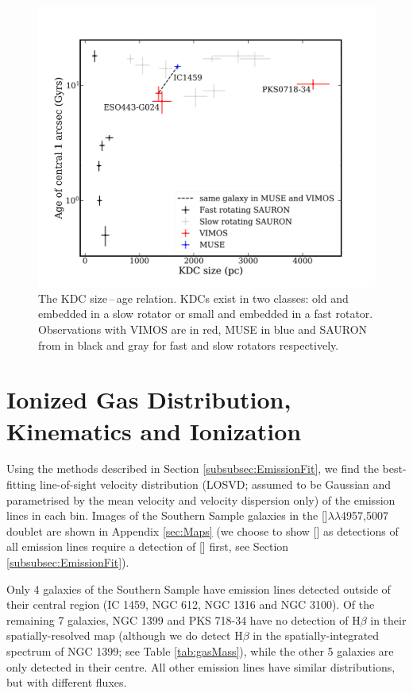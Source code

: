 \documentclass[a4paper,fleqn,usenatbib]{mnras}
\begin{document}
		\begin{figure}
			\includegraphics[width=\columnwidth]{KDC_size_age.png}
			\caption[KDC dichotomy]{The KDC size\,--\,age relation. KDCs exist in two classes: old and embedded in a slow rotator or small and embedded in a fast rotator. Observations with VIMOS are in red, MUSE in blue and SAURON from \citet{Kuntschner2010} in black and gray for fast and slow rotators respectively.}
			\label{fig:KDC}
		\end{figure}

\section{Ionized Gas Distribution, Kinematics and Ionization}
	\label{sec:gas}
	Using the methods described in Section \ref{subsubsec:EmissionFit}, we find the best-fitting line-of-sight velocity distribution (LOSVD; assumed to be Gaussian and parametrised by the mean velocity and velocity dispersion only) of the emission lines in each bin. Images of the Southern Sample galaxies in the []$\lambda\lambda$4957,5007 doublet are shown in Appendix \ref{sec:Maps} (we choose to show [] as detections of all emission lines require a detection of [] first, see Section \ref{subsubsec:EmissionFit}). 

	Only 4 galaxies of the Southern Sample have emission lines detected outside of their central region (IC 1459, NGC 612, NGC 1316 and NGC 3100). Of the remaining 7 galaxies, NGC 1399 and PKS 718-34 have no detection of H$\beta$ in their spatially-resolved map (although we do detect H$\beta$ in the spatially-integrated spectrum of NGC 1399; see Table \ref{tab:gasMass}), while the other 5 galaxies are only detected in their centre. All other emission lines have similar distributions, but with different fluxes.
\end{document}
